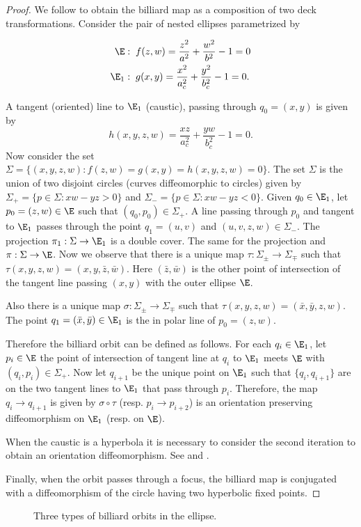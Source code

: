  \begin{proof}
 We follow \cite{bry} to obtain the billiard map as a composition of two deck transformations.  Consider the pair of nested   ellipses parametrized by
 
 \begin{align*}
     \E:&\;\; f(z,w)=\frac{z^2}{a^2}+\frac{w^2}{b^2}-1=0\\
     \E_1:&\;\; g(x,y)= \frac{x^2}{a_c^2}+\frac{y^2}{b_c^2}-1=0.
 \end{align*}
 
 A tangent (oriented) line to $\E_1$ (caustic), passing through $q_0=(x,y)$ is given by
 \[h(x,y,z,w) =\frac{xz}{a_c^2}+\frac{yw}{b_c^2}-1=0.\]
 Now consider the set
 $\Sigma= \{(x,y,z,w): f(z,w)=g(x,y)=h(x,y,z,w)=0\}.$  
 The set $\Sigma$ is the union of two disjoint circles (curves  diffeomorphic  to circles) given by
 $\Sigma_+=\{p\in \Sigma: xw-yz>0\} $ and
  $\Sigma_-=\{p\in \Sigma: xw-yz<0\}. $
  Given $q_0\in\E_1$, let $p_0=(z,w)\in \E$ such that $(q_0,p_0)\in\Sigma_+.$ A line passing through $p_0$ and tangent to $\E_1$ passes through the point $q_1=(u,v)$ and $(u,v,z,w)\in\Sigma_-.$ 
 The projection  $\pi_1:\Sigma \to \E_1$ is a double cover. The same for the projection
 and $\pi:\Sigma\to \E$. 
 Now we observe that there is a unique map $\tau:\Sigma_{\pm}\to \Sigma_{\mp}$ such that $\tau(x,y,z,w)=(x,y,\bar{z},\bar{w})$. Here $(\bar{z},\bar{w})$ is the other point of intersection of the tangent line passing $(x,y)$ with the outer ellipse $\E$.
 
Also there is a unique map $\sigma:\Sigma_{\pm}\to \Sigma_{\mp}$ such that $\tau(x,y,z,w)=( \bar{x},\bar{y},z,w)$. The point $q_1=( \bar{x},\bar{y})\in\E_1$ is the in polar line of $p_0=(z,w)$. 
 
 
 Therefore the billiard orbit can be defined as follows. For each $q_i\in \E_1$, let $p_i\in\E$ the point of intersection of tangent line at $q_i$ to $\E_1$ meets $\E$ with $(q_i,p_i)\in\Sigma_{+}$. Now let $q_{i+1}$ be the unique point on $\E_1$ such that $\{q_i,q_{i+1}\}$ are on the two tangent lines to $\E_1$ that pass through $p_i$. Therefore,   the map $q_i\to q_{i+1}$ is given by $\sigma\circ \tau$ (resp. $p_i\to p_{i+2}$) is an orientation preserving diffeomorphism on $\E_1$ (resp. on $\E$).

When the caustic is a hyperbola it is necessary to consider the second iteration to obtain an orientation diffeomorphism. See \cite{birkhoff1922} and \cite{kolod1985}.

Finally, when the orbit passes through a focus, the billiard map is conjugated with a diffeomorphism of the circle having two hyperbolic fixed points.
 
\end{proof}
 


\begin{figure}
	\begin{center}
		\def\svgwidth{1.0\textwidth}
		
		\caption{Three types of billiard orbits in the ellipse.}
	\end{center}
\label{fig:caustic2}
\end{figure}
